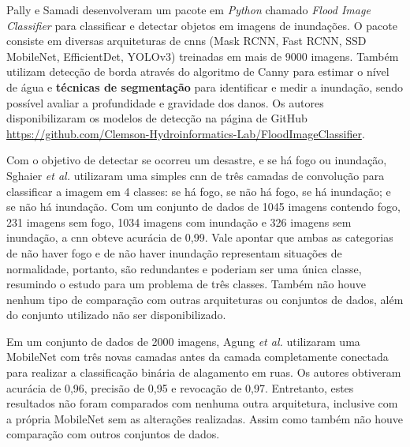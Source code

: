 Pally e Samadi\cite{PALLY2022105285} desenvolveram um pacote em \textit{Python} chamado \textit{Flood Image Classifier} para classificar e detectar objetos em imagens de inundações. 
O pacote consiste em diversas arquiteturas de \acrshort{cnn}s (Mask RCNN, Fast RCNN, SSD MobileNet, EfficientDet, YOLOv3) treinadas em mais de 9000 imagens. 
Também utilizam detecção de borda através do algoritmo de Canny\cite{canny1986} para estimar o nível de água e \textbf{técnicas de segmentação} para identificar e medir a inundação, 
sendo possível avaliar a profundidade e gravidade dos danos.
Os autores disponibilizaram os modelos de detecção na página de GitHub \url{https://github.com/Clemson-Hydroinformatics-Lab/FloodImageClassifier}.

Com o objetivo de detectar se ocorreu um desastre, e se há fogo ou inundação, Sghaier \textit{et al.}\cite{sghaier2023} utilizaram uma simples \acrshort{cnn} de três camadas de convolução para classificar a imagem em 4 classes: 
se há fogo, se não há fogo, se há inundação; e se não há inundação. 
Com um conjunto de dados de 1045 imagens contendo fogo, 231 imagens sem fogo, 1034 imagens com inundação e 326 imagens sem inundação, a \acrshort{cnn} obteve acurácia de 0,99. 
Vale apontar que ambas as categorias de não haver fogo e de não haver inundação representam situações de normalidade, portanto, são redundantes e poderiam ser uma única classe, 
resumindo o estudo para um problema de três classes.
Também não houve nenhum tipo de comparação com outras arquiteturas ou conjuntos de dados, além do conjunto utilizado não ser disponibilizado.

Em um conjunto de dados de 2000 imagens, Agung \textit{et al.}\cite{agung2023} utilizaram uma MobileNet com três novas camadas antes da camada completamente conectada para realizar a classificação binária de alagamento em ruas. 
Os autores obtiveram acurácia de 0,96, precisão de 0,95 e revocação de 0,97. 
Entretanto, estes resultados não foram comparados com nenhuma outra arquitetura, inclusive com a própria MobileNet sem as alterações realizadas. 
Assim como também não houve comparação com outros conjuntos de dados.


